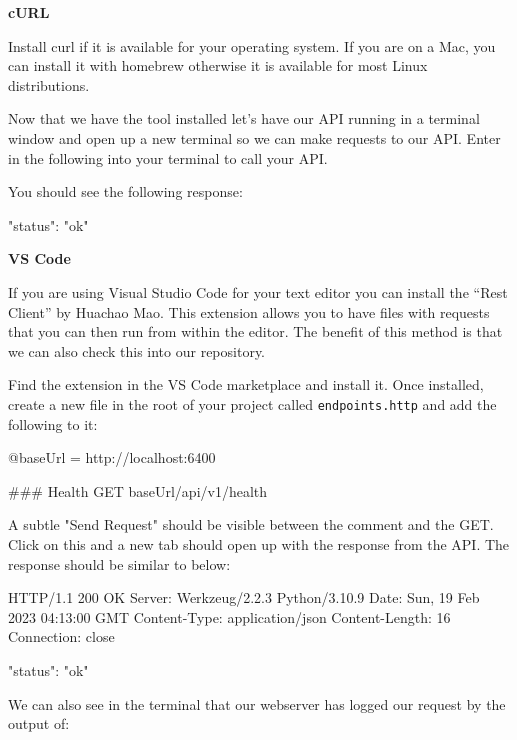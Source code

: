 \documentclass{csse4400}
\begin{document}
\vspace{0.5em}
\textbf{cURL}

Install curl if it is available for your operating system. If you are on a Mac, you can install it with homebrew otherwise it is available for most Linux distributions.

Now that we have the tool installed let's have our API running in a terminal window and open up a new terminal so we can make requests to our API. Enter in the following into your terminal to call your API.


You should see the following response:

\begin{code}[language=json,numbers=none]{}
  {
    "status": "ok"
  }
\end{code}

\textbf{VS Code}

If you are using Visual Studio Code for your text editor you can install the ``Rest Client'' by Huachao Mao. This extension allows you to have files with requests that you can then run from  within the editor. The benefit of this method is that we can also check this into our repository.

Find the extension in the VS Code marketplace and install it. Once installed, create a new file in the root of your project called \texttt{endpoints.http} and add the following to it:

\begin{code}[numbers=none]{}
  @baseUrl = http://localhost:6400

  ### Health
  GET {{baseUrl}}/api/v1/health
\end{code}

A subtle "Send Request" should be visible between the comment and the GET. Click on this and a new tab should open up with the response from the API. The response should be similar to below:

\begin{code}[language=json,numbers=none]{}
  HTTP/1.1 200 OK
  Server: Werkzeug/2.2.3 Python/3.10.9
  Date: Sun, 19 Feb 2023 04:13:00 GMT
  Content-Type: application/json
  Content-Length: 16
  Connection: close
    
  {
    "status": "ok"
  }
\end{code}

We can also see in the terminal that our webserver has logged our request by the output of:
\end{document}
